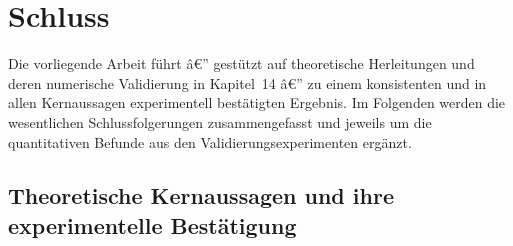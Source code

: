 ﻿\documentclass[12pt,a4paper,titlepage]{report}
\begin{document}
\chapter{Schluss}

Die vorliegende Arbeit führt â€” gestützt auf theoretische Herleitungen
und deren numerische Validierung in Kapitel~14 â€” zu einem konsistenten
und in allen Kernaussagen experimentell bestätigten Ergebnis.
Im Folgenden werden die wesentlichen Schlussfolgerungen zusammengefasst
und jeweils um die quantitativen Befunde aus den Validierungsexperimenten ergänzt.

\section*{Theoretische Kernaussagen und ihre experimentelle Bestätigung}
\end{document}
